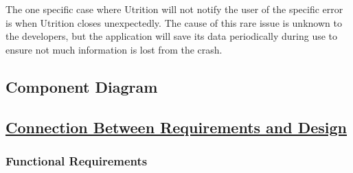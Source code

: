 \documentclass[12pt, titlepage]{article}
\begin{document}
The one specific case where Utrition will not notify the user of the specific error is when Utrition closes unexpectedly. The cause of this rare issue is unknown to the developers, but the application will save its data periodically during use to ensure not much information is lost from the crash.

\subsection{Component Diagram}

\subsection{\href{../../SRS/SRS.pdf}{Connection Between Requirements and Design}} \label{SecConnection}


\subsubsection{Functional Requirements}
\end{document}
